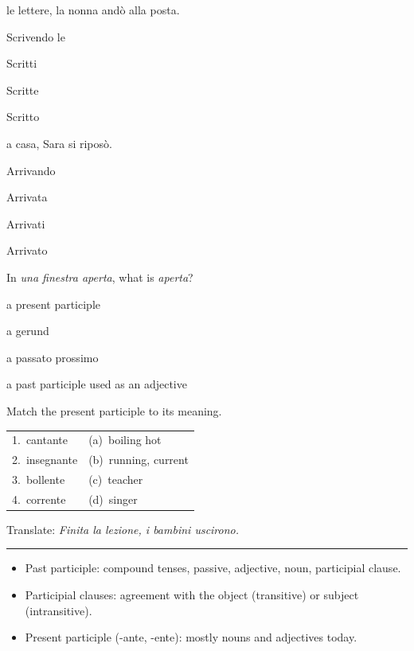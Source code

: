 \documentclass[11pt,a4paper,twoside,openright]{book}
\newcommand{\blank}{\underline{\hspace{2.6cm}}}
\newcommand{\answerline}{\par\vspace{6pt}\noindent\rule{0.75\linewidth}{0.4pt}\par}
\begin{document}
\begin{exercises}
\item\label{ex:participio-1}\relax \blank{} le lettere, la nonna andò alla posta.\par\nopagebreak\begin{options}
\item\relax Scrivendo le
\item\relax Scritti
\item\relax Scritte
\item\relax Scritto
\end{options}
\item\label{ex:participio-2}\relax \blank{} a casa, Sara si riposò.\par\nopagebreak\begin{options}
\item\relax Arrivando
\item\relax Arrivata
\item\relax Arrivati
\item\relax Arrivato
\end{options}
\item\label{ex:participio-3}\relax In \textit{una finestra aperta}, what is \textit{aperta}?\par\nopagebreak\begin{options}
\item\relax a present participle
\item\relax a gerund
\item\relax a passato prossimo
\item\relax a past participle used as an adjective
\end{options}
\item\label{ex:participio-4}\relax Match the present participle to its meaning.\par\smallskip\begin{tabularx}{\linewidth}{@{}L L@{}}
1.\ cantante & (a)\ boiling hot \\
2.\ insegnante & (b)\ running, current \\
3.\ bollente & (c)\ teacher \\
4.\ corrente & (d)\ singer \\
\end{tabularx}
\item\label{ex:participio-5}\relax Translate: \textit{Finita la lezione, i bambini uscirono.}\par\answerline
\end{exercises}

\begin{summarybox}
\begin{itemize}
\item\relax Past participle: compound tenses, passive, adjective, noun, participial clause.
\item\relax Participial clauses: agreement with the object (transitive) or subject (intransitive).
\item\relax Present participle (-ante, -ente): mostly nouns and adjectives today.
\end{itemize}
\end{summarybox}
\end{document}
